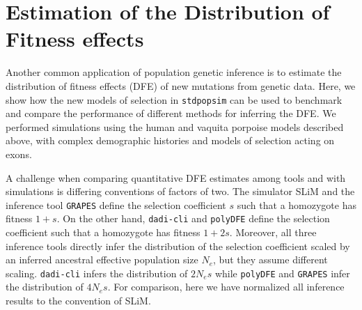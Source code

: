 \documentclass[hidelinks]{article}
\newcommand{\stdpopsim}{\texttt{stdpopsim}\xspace}
\newcommand{\polydfe}{\texttt{polyDFE}\xspace}
\newcommand{\dadicli}{\texttt{dadi-cli}\xspace}
\newcommand{\grapes}{\texttt{GRAPES}\xspace}
\begin{document}
\section*{Estimation of the Distribution of Fitness effects}
    \label{dfe}
    Another common application of population genetic inference is to estimate the distribution of fitness effects (DFE) of new mutations
    from genetic data. Here, we show how the new models of selection in \stdpopsim can be used to benchmark and compare
    the performance of different methods for inferring the DFE. We performed simulations using the 
    human and vaquita porpoise models described above, with complex demographic histories and models of selection acting on exons.
    
    A challenge when comparing quantitative DFE estimates among tools and with simulations is differing conventions of factors of two.
    The simulator SLiM and the inference tool \grapes define the selection coefficient $s$ such that a homozygote has fitness $1+s$.
    On the other hand, \dadicli and \polydfe define the selection coefficient such that a homozygote has fitness $1+ 2s$. %
    Moreover, all three inference tools directly infer the distribution of the selection coefficient scaled by an inferred ancestral effective population size $N_e$, but they assume different scaling.
    \dadicli infers the distribution of $2 N_e s$ while \polydfe and \grapes infer the distribution of $4 N_e s$. %
    For comparison, here we have normalized all inference results to the convention of SLiM.
           		
\end{document}
